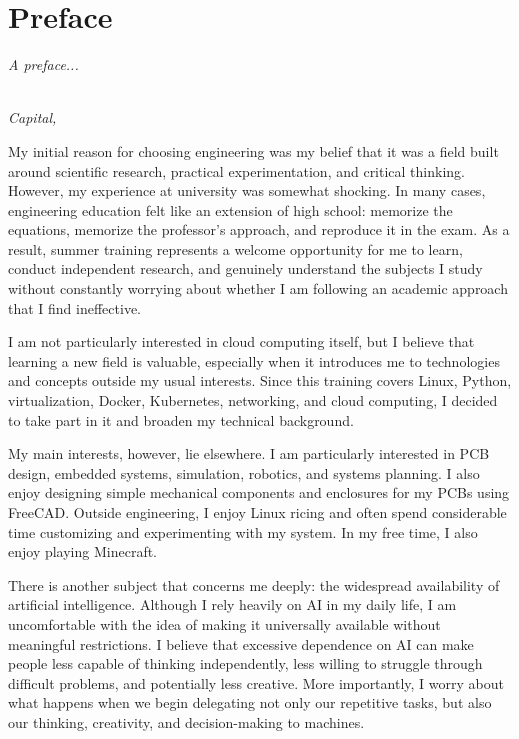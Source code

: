 \chapter*{Preface}

\emph{A preface...}

\begin{flushright}
{\makeatletter\itshape
    \@author \\
    Capital, \monthname{} \the\year{}
\makeatother}
\end{flushright}

My initial reason for choosing engineering was my belief that it was a field built around scientific research, practical experimentation, and critical thinking. However, my experience at university was somewhat shocking. In many cases, engineering education felt like an extension of high school: memorize the equations, memorize the professor’s approach, and reproduce it in the exam. As a result, summer training represents a welcome opportunity for me to learn, conduct independent research, and genuinely understand the subjects I study without constantly worrying about whether I am following an academic approach that I find ineffective.

I am not particularly interested in cloud computing itself, but I believe that learning a new field is valuable, especially when it introduces me to technologies and concepts outside my usual interests. Since this training covers Linux, Python, virtualization, Docker, Kubernetes, networking, and cloud computing, I decided to take part in it and broaden my technical background.

My main interests, however, lie elsewhere. I am particularly interested in PCB design, embedded systems, simulation, robotics, and systems planning. I also enjoy designing simple mechanical components and enclosures for my PCBs using FreeCAD. Outside engineering, I enjoy Linux ricing and often spend considerable time customizing and experimenting with my system. In my free time, I also enjoy playing Minecraft.

There is another subject that concerns me deeply: the widespread availability of artificial intelligence. Although I rely heavily on AI in my daily life, I am uncomfortable with the idea of making it universally available without meaningful restrictions. I believe that excessive dependence on AI can make people less capable of thinking independently, less willing to struggle through difficult problems, and potentially less creative. More importantly, I worry about what happens when we begin delegating not only our repetitive tasks, but also our thinking, creativity, and decision-making to machines.

